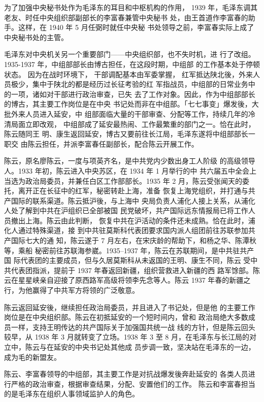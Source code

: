 为了加强中央秘书处作为毛泽东的耳目和中枢机构的作用，
1939 年，毛泽东调其老友、时任中央组织部副部长的李富春兼管中央秘书
处，由王首道作李富春的助手。这样，在 1940 年 5 月任弼时就任中央秘
书处领导之前，李富春实际上成了中央秘书处的主管。

毛泽东对中央机关另一个重要部门——中央组织部，也不失时机，进
行了改组。1935-1937 年，中组部部长由博古担任，在这段时期，中组部
的工作基本处于停顿状态。
因为在战时环境下，
干部调配基本由军委掌握，
红军抵达陕北後，外来人员极少，集中于陕北的都是经历过长征考验的红
军指战员，中组部的日常业务中的一项，诸如对干部进行政治审查，已失
去了工作对象。因此，作为中组部部长的博古，其主要工作岗位是在中央
书记处而非在中组部。「七七事变」爆发後，大批外来人员进入延安，中
组部面临大量的干部审查、分配等工作，持续几年的冷清局面立即改观，
中组部成了延安最热闹、工作最繁重的部门之一。恰在此时，陈云随同王
明、康生返回延安，博古又要前往长江局，毛泽东遂将中组部部长一职交
由陈云担任，并派李富春任副部长，配合陈云开展工作。

陈云，原名廖陈云，一度与项英齐名，是中共党内少数出身工人阶级
的高级领导人。1933 年初，陈云进入中央苏区，在 1934 年 1 月举行的中
共六届五中全会上当选为政治局委员，并兼任白区工作部部长。1935 年 2
月，陈云受张闻天的委托，离开正在长征中的红军，秘密转赴上海，准备
恢复上海党组织，并打通与共产国际的联系渠道。陈云抵沪後，与上海中
央局负责人浦化人接上关系，从浦化人处了解到中共在沪组织已全部被国
民党破坏，共产国际远东情报局已将工作人员撤出上海。陈云由此判断，
恢复中共在沪活动的条件还未成熟。恰在此时，浦化人通过特殊渠道，接
到中共驻莫斯科代表团要求国内派人组团前往苏联参加共产国际七大的通
知，陈云遂于 7 月左右，在宋庆龄的帮助下，和杨之华、陈潭秋等，乘船
秘密前往苏联海参崴。1935--1937 年，陈云在苏联期间，是中共驻共产国
际代表团的主要成员，但与久居莫斯科从未返国的王明、康生不同，陈云
受中共代表团指派，提前于 1937 年春返回新疆，组织营救进入新疆的西
路军馀部。陈云在星星峡亲自迎接了原西路军高级将领李先念等人。陈云
1937 年春的新疆之行，为他赢得了中共军方将领的广泛敬意。

陈云返回延安後，继续担任政治局委员，并且进入了书记处，但是他
的主要工作岗位是在中央组织部。陈云在初抵延安的一个短时间内，曾和
政治局绝大多数成员一样，支持王明传达的共产国际关于加强国共统一战
线的方针，但是陈云回头较早，从 1938 年 3 月就转变了立场。1938 年 3
至 8 月，在毛泽东与长江局的对立中，陈云与在延安的中央书记处其他成
员步调一致，坚决站在毛泽东的一边，成为毛的新盟友。

陈云、李富春领导的中组部，其主要工作是对抗战爆发後奔赴延安的
各类人员进行严格的政治审查，根据审查结果，分配、安置他们的工作。
陈云和李富春担当的是毛泽东在组织人事领域监护人的角色。

